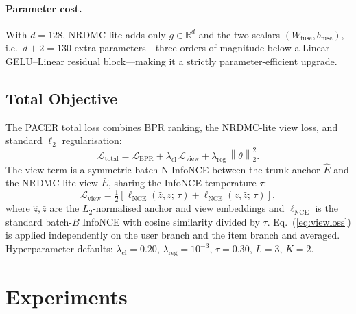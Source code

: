 \documentclass[conference]{IEEEtran}
\newcommand{\Lcal}{\mathcal{L}}
\newcommand{\norm}[1]{\left\lVert #1 \right\rVert}
\begin{document}
\paragraph{Parameter cost.} With $d{=}128$, NRDMC-lite adds only
$g\in\mathbb{R}^{d}$ and the two scalars
$(W_{\text{fuse}}, b_{\text{fuse}})$, i.e.\ $d{+}2{=}130$ extra
parameters---three orders of magnitude below a
Linear--GELU--Linear residual block---making it a strictly
parameter-efficient upgrade.

\subsection{Total Objective}
\label{sec:totalloss}

The PACER total loss combines BPR ranking, the NRDMC-lite view loss,
and standard $\ell_2$ regularisation:
\begin{equation}
\Lcal_{\text{total}} =
  \Lcal_{\text{BPR}}
  + \lambda_{\text{cl}}\,\Lcal_{\text{view}}
  + \lambda_{\text{reg}}\,\norm{\theta}_2^2.
\label{eq:totalloss}
\end{equation}
The view term is a symmetric batch-N InfoNCE between the trunk anchor
$\hat E$ and the NRDMC-lite view $\bar E$, sharing the InfoNCE
temperature $\tau$:
\begin{equation}
\Lcal_{\text{view}} =
  \tfrac{1}{2}\!\left[
    \ell_{\text{NCE}}(\hat z, \bar z;\, \tau)
    + \ell_{\text{NCE}}(\bar z, \hat z;\, \tau)
  \right],
\label{eq:viewloss}
\end{equation}
where $\hat z, \bar z$ are the $L_2$-normalised anchor and view
embeddings and $\ell_{\text{NCE}}$ is the standard batch-$B$ InfoNCE
with cosine similarity divided by $\tau$. Eq.~(\ref{eq:viewloss}) is
applied independently on the user branch and the item branch and
averaged. Hyperparameter defaults: $\lambda_{\text{cl}}{=}0.20$,
$\lambda_{\text{reg}}{=}10^{-3}$, $\tau{=}0.30$, $L{=}3$, $K{=}2$.

\section{Experiments}
\label{sec:results}
\end{document}
